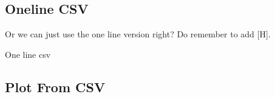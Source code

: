 \documentclass{article}
\begin{document}

\subsection{Oneline CSV}
Or we can just use the one line version right?
Do remember to add [H].
\begin{table}[H]
    \begin{center}
        \caption{One line csv}
        \label{tab:oneline}
    \end{center}
\end{table}


\subsection{Plot From CSV}
\end{document}
